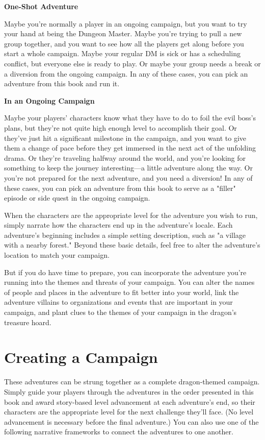 \documentclass[letterpaper, 11pt, twocolumn]{dndbook}
\begin{document}
\textbf{One-Shot Adventure}

Maybe you're normally a player in an ongoing campaign, but you want to try your hand at being the Dungeon Master. Maybe you're trying to pull a new group together, and you want to see how all the players get along before you start a whole campaign. Maybe your regular DM is sick or has a scheduling conflict, but everyone else is ready to play. Or maybe your group needs a break or a diversion from the ongoing campaign. In any of these cases, you can pick an adventure from this book and run it.

\textbf{In an Ongoing Campaign}

Maybe your players' characters know what they have to do to foil the evil boss's plans, but they're not quite high enough level to accomplish their goal. Or they've just hit a significant milestone in the campaign, and you want to give them a change of pace before they get immersed in the next act of the unfolding drama. Or they're traveling halfway around the world, and you're looking for something to keep the journey interesting---a little adventure along the way. Or you're not prepared for the next adventure, and you need a diversion! In any of these cases, you can pick an adventure from this book to serve as a "filler" episode or side quest in the ongoing campaign.


When the characters are the appropriate level for the adventure you wish to run, simply narrate how the characters end up in the adventure's locale. Each adventure's beginning includes a simple setting description, such as "a village with a nearby forest." Beyond these basic details, feel free to alter the adventure's location to match your campaign.

But if you do have time to prepare, you can incorporate the adventure you're running into the themes and threats of your campaign. You can alter the names of people and places in the adventure to fit better into your world, link the adventure villains to organizations and events that are important in your campaign, and plant clues to the themes of your campaign in the dragon's treasure hoard.
\section{Creating a Campaign}

These adventures can be strung together as a complete dragon-themed campaign. Simply guide your players through the adventures in the order presented in this book and award story-based level advancement at each adventure's end, so their characters are the appropriate level for the next challenge they'll face. (No level advancement is necessary before the final adventure.) You can also use one of the following narrative frameworks to connect the adventures to one another.
\end{document}
